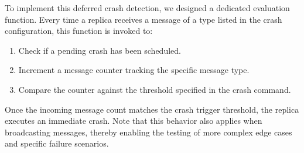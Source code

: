 To implement this deferred crash detection, we designed a dedicated evaluation function. Every time a replica receives a message of a type listed in the crash configuration, this function is invoked to:
\begin{enumerate}
    \item Check if a pending crash has been scheduled.
    \item Increment a message counter tracking the specific message type.
    \item Compare the counter against the threshold specified in the crash command.
\end{enumerate}
Once the incoming message count matches the crash trigger threshold, the replica executes an immediate crash. Note that this behavior also applies when broadcasting messages, thereby enabling the testing of more complex edge cases and specific failure scenarios.
